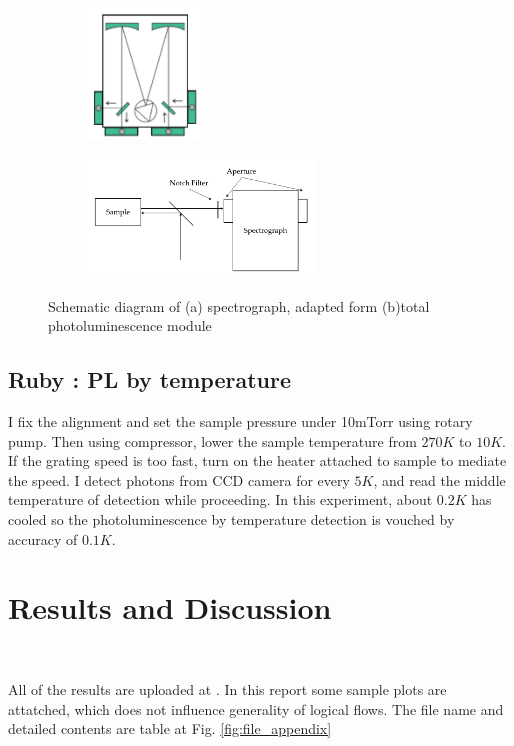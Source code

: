 \documentclass{article}
\begin{document}
 \begin{figure}[ht]
  \centering
  \begin{subfigure}[b]{6cm}
      \centering
      \includegraphics[width=3cm]{../results/spectrograph_sketch.png}
      \caption{}
  \end{subfigure}
  \hfill
  \begin{subfigure}[b]{6cm}
      \centering
      \includegraphics[width=6cm]{../results/total_module_sketch.png}
      \caption{}
  \end{subfigure}
  \hfill
  \caption{Schematic diagram of (a) spectrograph, adapted form  \cite{spectrograph_spec} (b)total photoluminescence module}
  \label{fig:apparatus_sketch}
\end{figure}


\subsection{Ruby : PL by temperature}
 I fix the alignment and set the sample pressure under 10mTorr using rotary pump.
 Then using compressor, lower the sample temperature from $270K$ to $10K$.
 If the grating speed is too fast, turn on the heater attached to sample to mediate the speed.
 I detect photons from CCD camera for every $5K$, and read the middle temperature of detection while proceeding.
 In this experiment, about $0.2K$ has cooled so the photoluminescence by temperature detection is vouched by accuracy of $0.1K$.


\section{Results and Discussion}\

All of the results are uploaded at \cite{github_results}.
In this report some sample plots are attatched, which does not influence generality of logical flows.
The file name and detailed contents are table at Fig. \ref{fig:file_appendix}
\end{document}
